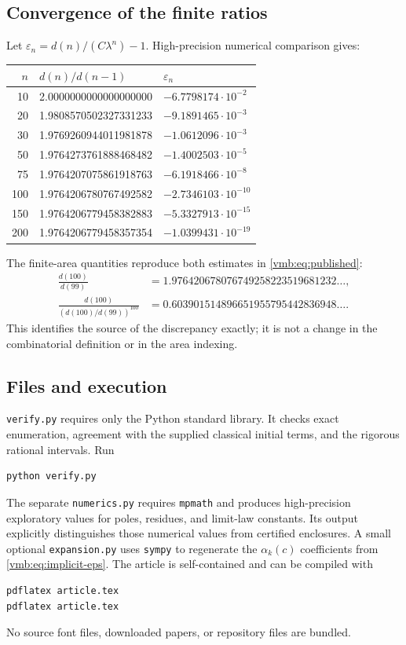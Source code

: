 \documentclass[11pt,a4paper]{article}
\numberwithin{equation}{section}
\theoremstyle{definition}\newtheorem{definition}[theorem]{Definition}
\theoremstyle{remark}\newtheorem{remark}[theorem]{Remark}
\begin{document}
\subsection{Convergence of the finite ratios}
Let \(\varepsilon_n=d(n)/(C\lambda^n)-1\). High-precision numerical
comparison gives:
\begin{center}
\begin{tabular}{@{}rll@{}}
\toprule
\(n\)&\(d(n)/d(n-1)\)&\(\varepsilon_n\)\\
\midrule
10&2.0000000000000000000&\(-6.7798174\cdot10^{-2}\)\\
20&1.9808570502327331233&\(-9.1891465\cdot10^{-3}\)\\
30&1.9769260944011981878&\(-1.0612096\cdot10^{-3}\)\\
50&1.9764273761888468482&\(-1.4002503\cdot10^{-5}\)\\
75&1.9764207075861918763&\(-6.1918466\cdot10^{-8}\)\\
100&1.9764206780767492582&\(-2.7346103\cdot10^{-10}\)\\
150&1.9764206779458382883&\(-5.3327913\cdot10^{-15}\)\\
200&1.9764206779458357354&\(-1.0399431\cdot10^{-19}\)\\
\bottomrule
\end{tabular}
\end{center}
The finite-area quantities reproduce both estimates in
\eqref{vmb:eq:published}:
\begin{align*}
\frac{d(100)}{d(99)}
 &=1.976420678076749258223519681232\ldots,\\
\frac{d(100)}{(d(100)/d(99))^{100}}
 &=0.603901514896651955795442836948\ldots.
\end{align*}
This identifies the source of the discrepancy exactly; it is not a
change in the combinatorial definition or in the area indexing.

\subsection{Files and execution}
\texttt{verify.py} requires only the Python standard library. It checks
exact enumeration, agreement with the supplied classical initial terms,
and the rigorous rational intervals. Run
\begin{verbatim}
python verify.py
\end{verbatim}
The separate \texttt{numerics.py} requires \texttt{mpmath} and produces
high-precision exploratory values for poles, residues, and limit-law
constants. Its output explicitly distinguishes those numerical values
from certified enclosures. A small optional \texttt{expansion.py}
uses \texttt{sympy} to regenerate the \(\alpha_k(c)\) coefficients
from \eqref{vmb:eq:implicit-eps}. The article is self-contained and can be
compiled with
\begin{verbatim}
pdflatex article.tex
pdflatex article.tex
\end{verbatim}
No source font files, downloaded papers, or repository files are bundled.
\end{document}
